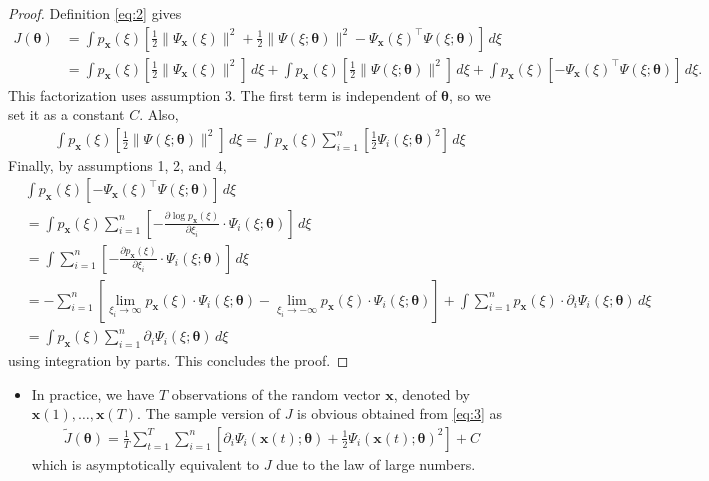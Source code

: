 \documentclass[10pt]{article}
\begin{document}
\begin{proof}
Definition \eqref{eq:2} gives
\begin{align*}
J(\bm{\theta}) &= \int p_\mathbf{x}(\xi) \left[ \frac{1}{2} \|\Psi_\mathbf{x}(\xi)\|^2 + \frac{1}{2} \|\Psi(\xi;\bm{\theta})\|^2 - \Psi_\mathbf{x}(\xi)^\top \Psi(\xi;\bm{\theta}) \right] \, d\xi \\
&= \int p_\mathbf{x}(\xi) \left[ \frac{1}{2} \|\Psi_\mathbf{x}(\xi)\|^2 \right] \, d\xi + \int p_\mathbf{x}(\xi) \left[ \frac{1}{2} \|\Psi(\xi;\bm{\theta})\|^2 \right] \, d\xi + \int p_\mathbf{x}(\xi) \left[ - \Psi_\mathbf{x}(\xi)^\top \Psi(\xi;\bm{\theta}) \right] \, d\xi.
\end{align*}
This factorization uses assumption 3. The first term is independent of $\bm{\theta}$, so we set it as a constant $C$. Also,
\begin{align*}
\int p_\mathbf{x}(\xi) \left[ \frac{1}{2} \| \Psi(\xi;\bm{\theta}) \|^2 \right] \, d\xi = \int p_\mathbf{x}(\xi) \sum_{i = 1}^n \left[ \frac{1}{2} \Psi_i(\xi;\bm{\theta})^2 \right] \, d\xi
\end{align*}
Finally, by assumptions 1, 2, and 4,
\begin{align*}
&\int p_\mathbf{x}(\xi) \left[ - \Psi_\mathbf{x}(\xi)^\top \Psi(\xi;\bm{\theta}) \right] \, d\xi \\
&= \int p_\mathbf{x}(\xi) \sum_{i = 1}^n \left[ -\frac{\partial \log p_\mathbf{x}(\xi)}{\partial \xi_i} \cdot \Psi_i(\xi;\bm{\theta}) \right] \, d\xi \\
&= \int \sum_{i = 1}^n \left[ -\frac{\partial p_\mathbf{x}(\xi)}{\partial \xi_i} \cdot \Psi_i(\xi;\bm{\theta}) \right] \, d\xi \\
&= -\sum_{i = 1}^n \left[ \lim_{\xi_i \rightarrow \infty} p_\mathbf{x}(\xi) \cdot \Psi_i(\xi;\bm{\theta}) - \lim_{\xi_i \rightarrow -\infty} p_\mathbf{x}(\xi) \cdot \Psi_i(\xi;\bm{\theta}) \right] + \int \sum_{i = 1}^n p_\mathbf{x}(\xi) \cdot \partial_i \Psi_i(\xi;\bm{\theta}) \, d\xi \\
&= \int p_\mathbf{x}(\xi) \sum_{i = 1}^n \partial_i \Psi_i(\xi;\bm{\theta}) \, d\xi
\end{align*}
using integration by parts. This concludes the proof.
\end{proof}

\begin{itemize}
\item In practice, we have $T$ observations of the random vector $\mathbf{x}$, denoted by $\mathbf{x}(1), \ldots, \mathbf{x}(T)$. The sample version of $J$ is obvious obtained from \eqref{eq:3} as
\begin{align}
\tilde{J}(\bm{\theta}) = \frac{1}{T} \sum_{t = 1}^T \sum_{i = 1}^n \left[ \partial_i \Psi_i(\mathbf{x}(t);\bm{\theta}) + \frac{1}{2} \Psi_i(\mathbf{x}(t);\bm{\theta})^2 \right] + C \label{eq:4}
\end{align}
which is asymptotically equivalent to $J$ due to the law of large numbers.
\end{itemize}
\end{document}
